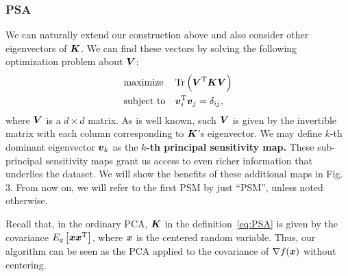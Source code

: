 \subsubsection{PSA}
%
We can naturally extend our construction above and also consider other
eigenvectors of $\mbox{\boldmath $K$}$.
%
We can find these vectors by solving the following optimization
problem about $\mbox{\boldmath $V$}$:
\begin{align}
\begin{split}
\begin{aligned}
& \text{maximize}
& & \mathrm{Tr}\left(\mbox{\boldmath $V$}^{\mathrm{T}} \mbox{\boldmath $K$} \mbox{\boldmath $V$}\right) \\
& \text{subject to}
& & \mbox{\boldmath $v$}_i^{\mathrm{T}}\mbox{\boldmath $v$}_j = \delta_{ij},
\end{aligned}
\end{split} \label{eq:PSA}
\end{align}
%
where $\mbox{\boldmath $V$}$ is a $d \times d$ matrix. As is well known, such $\mbox{\boldmath $V$}$ is given by
the invertible matrix with each column corresponding to $\mbox{\boldmath $K$}$'s
eigenvector.
%
We may define $k$-th dominant eigenvector $\mbox{\boldmath $v$}_{k}$ as
the \textbf{$k$-th principal sensitivity map.} These sub-principal sensitivity maps grant us
access to even richer information that underlies the dataset.
%
We will show the benefits of these additional maps in Fig.\,3.
From now on, we will refer to the first PSM by just ``PSM'', unless noted otherwise.

Recall that, in the ordinary PCA,  $\mbox{\boldmath $K$}$ in the definition~\eqref{eq:PSA} is given by the covariance
$E_q\left[ \mbox{\boldmath $x$} \mbox{\boldmath $x$}^{\mathrm{T}} \right]$, where $\mbox{\boldmath $x$}$ is the
centered random variable.
%
Thus, our algorithm can be seen as the PCA
applied to the covariance of $\nabla f(\mbox{\boldmath $x$})$ without centering.

